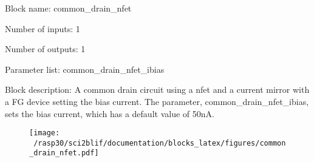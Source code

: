 \pagebreak

Block name: common\_drain\_nfet

Number of inputs: 1

Number of outputs: 1

Parameter list: common\_drain\_nfet\_ibias

Block description: 
A common drain circuit using a nfet and a current mirror with a FG device setting the bias current. The parameter, common\_drain\_nfet\_ibias, sets the bias current, which has a default value of 50nA.

\begin{figure}[H]  %
\texttt{[image: ~/rasp30/sci2blif/documentation/blocks\_latex/figures/common\_drain\_nfet.pdf]}
\end{figure}

